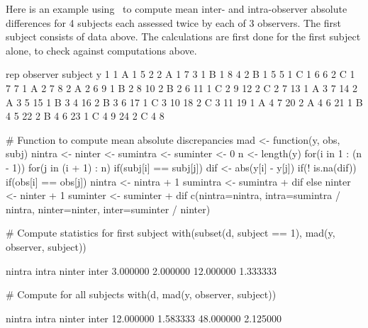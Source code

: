 Here is an example using \R\ to compute mean inter- and
intra-observer absolute differences for 4 subjects each assessed
twice by each of 3 observers.  The first subject consists of data
above.  The calculations are first done for the first subject alone,
to check against computations above.
\begin{Schunk}
\begin{Soutput}
   rep observer subject  y
1    1        A       1  5
2    2        A       1  7
3    1        B       1  8
4    2        B       1  5
5    1        C       1  6
6    2        C       1  7
7    1        A       2  7
8    2        A       2  6
9    1        B       2  8
10   2        B       2  6
11   1        C       2  9
12   2        C       2  7
13   1        A       3  7
14   2        A       3  5
15   1        B       3  4
16   2        B       3  6
17   1        C       3 10
18   2        C       3 11
19   1        A       4  7
20   2        A       4  6
21   1        B       4  5
22   2        B       4  6
23   1        C       4  9
24   2        C       4  8
\end{Soutput}
\begin{Sinput}
# Function to compute mean absolute discrepancies
mad <- function(y, obs, subj) {
  nintra <- ninter <- sumintra <- suminter <- 0
  n <- length(y)
  for(i in 1 : (n - 1)) {
    for(j in (i + 1) : n) {
      if(subj[i] == subj[j]) {
        dif <- abs(y[i] - y[j])
        if(! is.na(dif)) {
          if(obs[i] == obs[j]) {
            nintra   <- nintra + 1
            sumintra <- sumintra + dif
          }
          else {
            ninter   <- ninter + 1
            suminter <- suminter + dif
          }
        }
      }
    }
  }
  c(nintra=nintra, intra=sumintra / nintra,
    ninter=ninter, inter=suminter / ninter)
}
  
# Compute statistics for first subject
with(subset(d, subject == 1), mad(y, observer, subject))
\end{Sinput}
\begin{Soutput}
   nintra     intra    ninter     inter 
 3.000000  2.000000 12.000000  1.333333 
\end{Soutput}
\begin{Sinput}
# Compute for all subjects
with(d, mad(y, observer, subject))
\end{Sinput}
\begin{Soutput}
   nintra     intra    ninter     inter 
12.000000  1.583333 48.000000  2.125000 
\end{Soutput}
\end{Schunk}
